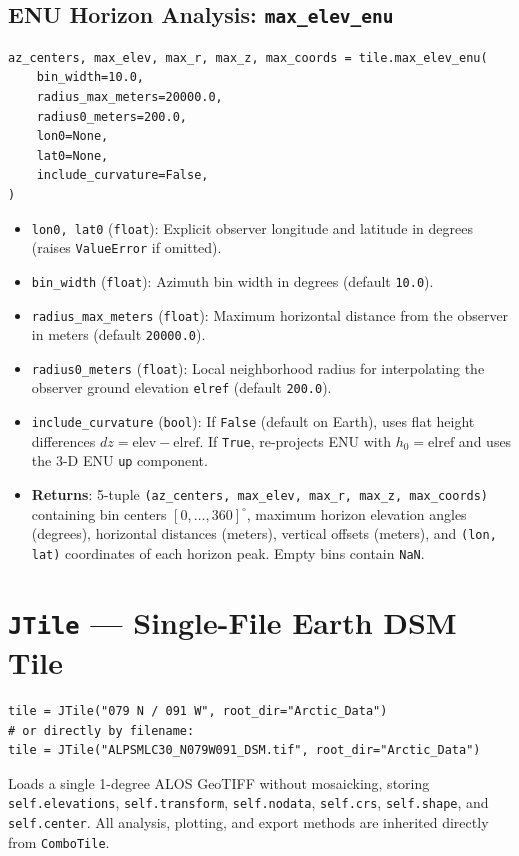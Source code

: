 \documentclass[11pt,letterpaper]{article}
\begin{document}
\subsection{ENU Horizon Analysis: \texttt{max\_elev\_enu}}
\begin{lstlisting}
az_centers, max_elev, max_r, max_z, max_coords = tile.max_elev_enu(
    bin_width=10.0,
    radius_max_meters=20000.0,
    radius0_meters=200.0,
    lon0=None,
    lat0=None,
    include_curvature=False,
)
\end{lstlisting}
\begin{itemize}
  \item \texttt{lon0, lat0} (\texttt{float}): Explicit observer longitude and latitude in degrees (raises \texttt{ValueError} if omitted).
  \item \texttt{bin\_width} (\texttt{float}): Azimuth bin width in degrees (default \texttt{10.0}).
  \item \texttt{radius\_max\_meters} (\texttt{float}): Maximum horizontal distance from the observer in meters (default \texttt{20000.0}).
  \item \texttt{radius0\_meters} (\texttt{float}): Local neighborhood radius for interpolating the observer ground elevation \texttt{elref} (default \texttt{200.0}).
  \item \texttt{include\_curvature} (\texttt{bool}): If \texttt{False} (default on Earth), uses flat height differences $dz = \mathrm{elev} - \mathrm{elref}$. If \texttt{True}, re-projects ENU with $h_0 = \mathrm{elref}$ and uses the 3-D ENU \texttt{up} component.
  \item \textbf{Returns}: 5-tuple \texttt{(az\_centers, max\_elev, max\_r, max\_z, max\_coords)} containing bin centers $[0, \dots, 360]^\circ$, maximum horizon elevation angles (degrees), horizontal distances (meters), vertical offsets (meters), and \texttt{(lon, lat)} coordinates of each horizon peak. Empty bins contain \texttt{NaN}.
\end{itemize}

\section{\texttt{JTile} --- Single-File Earth DSM Tile}
\begin{lstlisting}
tile = JTile("079 N / 091 W", root_dir="Arctic_Data")
# or directly by filename:
tile = JTile("ALPSMLC30_N079W091_DSM.tif", root_dir="Arctic_Data")
\end{lstlisting}
Loads a single 1-degree ALOS GeoTIFF without mosaicking, storing \texttt{self.elevations}, \texttt{self.transform}, \texttt{self.nodata}, \texttt{self.crs}, \texttt{self.shape}, and \texttt{self.center}. All analysis, plotting, and export methods are inherited directly from \texttt{ComboTile}.
\end{document}
